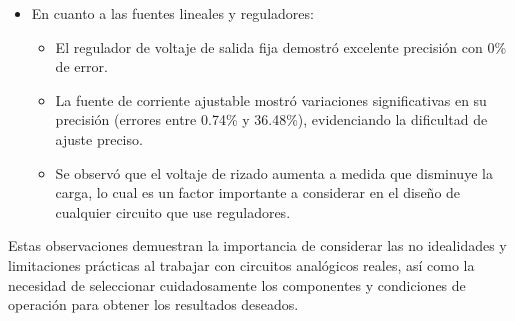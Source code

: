 \begin{itemize}
    \item En cuanto a las fuentes lineales y reguladores:
    \begin{itemize}
        \item El regulador de voltaje de salida fija demostró excelente precisión con 0\% de error.
        \item La fuente de corriente ajustable mostró variaciones significativas en su precisión (errores entre 0.74\% y 36.48\%), evidenciando la dificultad de ajuste preciso.
        \item Se observó que el voltaje de rizado aumenta a medida que disminuye la carga, lo cual es un factor importante a considerar en el diseño de cualquier circuito que use reguladores.
    \end{itemize}
\end{itemize}

Estas observaciones demuestran la importancia de considerar las no idealidades y limitaciones prácticas al trabajar con circuitos analógicos reales, así como la necesidad de seleccionar cuidadosamente los componentes y condiciones de operación para obtener los resultados deseados.